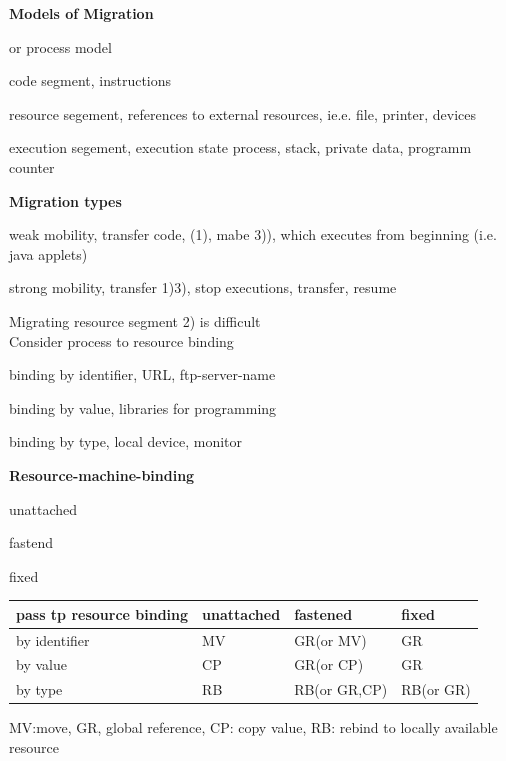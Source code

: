 \textbf{Models of Migration}
\begin{compactitem}
	\item or process model\begin{compactenum}
		\item code segment, instructions
		\item resource segement, references to external resources, ie.e. file, printer, devices
		\item execution segement, execution state process, stack, private data, programm counter

	\end{compactenum}
	\item \textbf{Migration types}\begin{compactitem}
		\item weak mobility, transfer code, (1), mabe 3)), which executes from beginning (i.e. java applets)
		\item strong mobility, transfer 1)3), stop executions, transfer, resume
	\end{compactitem}
\end{compactitem}


Migrating resource segment 2) is difficult\\
Consider process to resource binding\\
\begin{compactenum}
	\item binding by identifier, URL, ftp-server-name
	\item binding by value, libraries for programming
	\item binding by type, local device, monitor
\end{compactenum}

\textbf{Resource-machine-binding}
\begin{compactenum}
	\item unattached
	\item fastend
	\item fixed
\end{compactenum}

\begin{tabular}{l| l| l| l}
pass tp resource binding&unattached&fastened&fixed\\
\hline
by identifier& MV&GR(or MV)& GR\\
\hline
by value& CP& GR(or CP)& GR\\
\hline
by type& RB&RB(or GR,CP)&RB(or GR)\\
\end{tabular}
MV:move, GR, global reference, CP: copy value, RB: rebind to locally available resource


